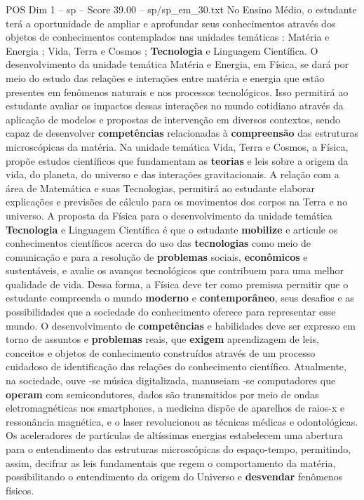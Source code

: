 \begin{textsample}{POS Dim 1 – sp – Score 39.00 – sp/sp\_em\_30.txt}
No Ensino Médio, o estudante terá a oportunidade de ampliar e aprofundar seus conhecimentos através dos objetos de conhecimentos contemplados nas unidades temáticas : Matéria e Energia ; Vida, Terra e Cosmos ; \textbf{Tecnologia} e Linguagem Científica.
O desenvolvimento da unidade temática Matéria e Energia, em Física, se dará por meio do estudo das relações e interações entre matéria e energia que estão presentes em fenômenos naturais e nos processos tecnológicos.
Isso permitirá ao estudante avaliar os impactos dessas interações no mundo cotidiano através da aplicação de modelos e propostas de intervenção em diversos contextos, sendo capaz de desenvolver \textbf{competências} relacionadas à \textbf{compreensão} das estruturas microscópicas da matéria.
Na unidade temática Vida, Terra e Cosmos, a Física, propõe estudos científicos que fundamentam as \textbf{teorias} e leis sobre a origem da vida, do planeta, do universo e das interações gravitacionais.
A relação com a área de Matemática e suas Tecnologias, permitirá ao estudante elaborar explicações e previsões de cálculo para os movimentos dos corpos na Terra e no universo.
A proposta da Física para o desenvolvimento da unidade temática \textbf{Tecnologia} e Linguagem Científica é que o estudante \textbf{mobilize} e articule os conhecimentos científicos acerca do uso das \textbf{tecnologias} como meio de comunicação e para a resolução de \textbf{problemas} sociais, \textbf{econômicos} e sustentáveis, e avalie os avanços tecnológicos que contribuem para uma melhor qualidade de vida.
Dessa forma, a Física deve ter como premissa permitir que o estudante compreenda o mundo \textbf{moderno} e \textbf{contemporâneo}, seus desafios e as possibilidades que a sociedade do conhecimento oferece para representar esse mundo.
O desenvolvimento de \textbf{competências} e habilidades deve ser expresso em torno de assuntos e \textbf{problemas} reais, que \textbf{exigem} aprendizagem de leis, conceitos e objetos de conhecimento construídos através de um processo cuidadoso de identificação das relações do conhecimento científico.
Atualmente, na sociedade, ouve -se música digitalizada, manuseiam -se computadores que \textbf{operam} com semicondutores, dados são transmitidos por meio de ondas eletromagnéticas nos smartphones, a medicina dispõe de aparelhos de raios-x e ressonância magnética, e o laser revolucionou as técnicas médicas e odontológicas.
Os aceleradores de partículas de altíssimas energias estabelecem uma abertura para o entendimento das estruturas microscópicas do espaço-tempo, permitindo, assim, decifrar as leis fundamentais que regem o comportamento da matéria, possibilitando o entendimento da origem do Universo e \textbf{desvendar} fenômenos físicos.

\end{textsample}

